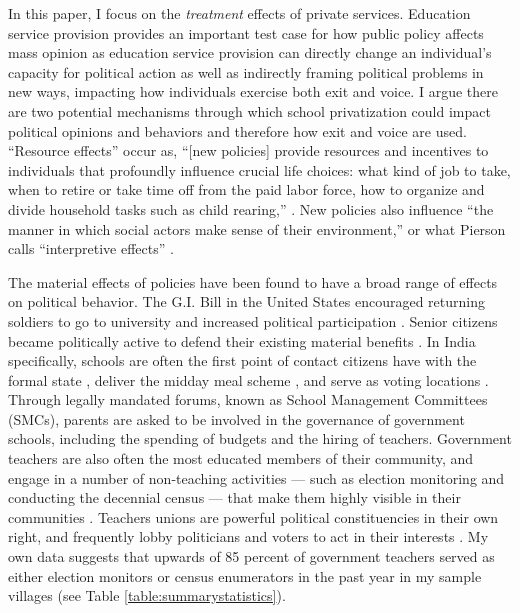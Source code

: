\documentclass[hidelinks, 12pt, titlepage]{article}
\begin{document}
	In this paper, I focus on the \emph{treatment} effects of private services. Education service provision provides an important test case for how public policy affects mass opinion as education service provision can directly change an individual's capacity for political action as well as indirectly framing political problems in new ways, impacting how individuals exercise both exit and voice.  I argue there are two potential mechanisms through which school privatization could impact political opinions and behaviors and therefore how exit and voice are used.  ``Resource effects'' occur as, ``[new policies] provide resources and incentives to individuals that profoundly influence crucial life choices: what kind of job to take, when to retire or take time off from the paid labor force, how to organize and divide household tasks such as child rearing,'' \citep[606]{Pierson1993}.  New policies also influence ``the manner in which social actors make sense of their environment,'' or what Pierson calls ``interpretive effects'' \citep[610-1]{Pierson1993}.

	The material effects of policies have been found to have a broad range of effects on political behavior.  The G.I. Bill in the United States encouraged returning soldiers to go to university and increased political participation \citep{Mettler2005}.  Senior citizens became politically active to defend their existing material benefits \citep{Campbell2003,Lynch2006}.  In India specifically, schools are often the first point of contact citizens have with the formal state \citep{Corbridge2005}, deliver the midday meal scheme \citep{Dreze2001}, and serve as voting locations \citep{Neggers2018}.  Through legally mandated forums, known as School Management Committees (SMCs), parents are asked to be involved in the governance of government schools, including the spending of budgets and the hiring of teachers.  Government teachers are also often the most educated members of their community, and engage in a number of non-teaching activities --- such as election monitoring and conducting the decennial census --- that make them highly visible in their communities \citep{Beteille2015}.  Teachers unions are powerful political constituencies in their own right, and frequently lobby politicians and voters to act in their interests \citep{Kingdon2009a}.  My own data suggests that upwards of 85 percent of government teachers served as either election monitors or census enumerators in the past year in my sample villages (see Table \ref{table:summarystatistics}).
\end{document}
